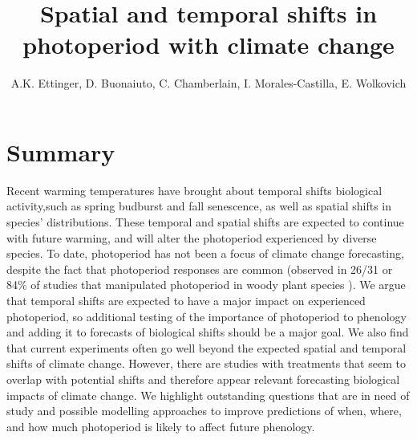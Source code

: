 \documentclass{article}
\begin{document}
 
\title{Spatial and temporal shifts in photoperiod with climate change} %

\author{A.K. Ettinger, D. Buonaiuto, C. Chamberlain, I. Morales-Castilla, E. Wolkovich}
\maketitle  %


\section*{Summary}
Recent warming temperatures have brought about temporal shifts biological activity,such as spring budburst and fall senescence, as well as spatial shifts in species' distributions. These temporal and spatial shifts are expected to continue with future warming, and will alter the photoperiod experienced by diverse species. To date, photoperiod has not been a focus of climate change forecasting, despite the fact that photoperiod responses are common (observed in 26/31 or 84\% of studies that manipulated photoperiod in woody plant species ). We argue that temporal shifts are expected to have a major impact on experienced photoperiod, so additional testing of the importance of photoperiod to phenology and adding it to forecasts of biological shifts should be a major goal. We also find that current experiments often go well beyond the expected spatial and temporal shifts of climate change. However, there are studies with treatments that seem to overlap with potential shifts and therefore appear relevant forecasting biological impacts of climate change. We highlight outstanding questions that are in need of study and possible modelling approaches to improve predictions of when, where, and how much photoperiod is likely to affect future phenology.
\end{document}

